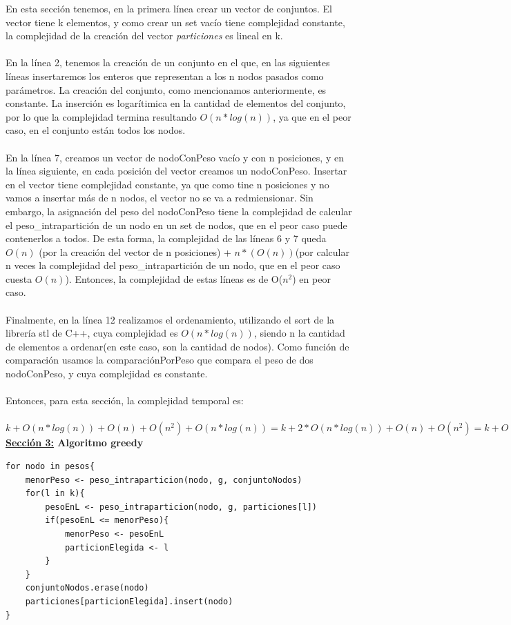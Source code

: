 En esta sección tenemos, en la primera línea crear un vector de conjuntos. El vector tiene k elementos, y como crear un set vacío tiene complejidad constante, la complejidad de la creación del vector \textit{particiones} es lineal en k.\\\\
En la línea 2, tenemos la creación de un conjunto en el que, en las siguientes líneas insertaremos los enteros que representan a los n nodos pasados como parámetros. La creación del conjunto, como mencionamos anteriormente, es constante. La inserción es logarítimica en la cantidad de elementos del conjunto, por lo que la complejidad termina resultando $O(n*log (n))$, ya que en el peor caso, en el conjunto están todos los nodos.\\\\
En la línea 7, creamos un vector de nodoConPeso vacío y con n posiciones, y en la línea siguiente, en cada posición del vector creamos un nodoConPeso. Insertar en el vector tiene complejidad constante, ya que como tine n posiciones y no vamos a insertar más de n nodos, el vector no se va a redmiensionar. Sin embargo, la asignación del peso del nodoConPeso tiene la complejidad de calcular el peso\_intrapartición de un nodo en un set de nodos, que en el peor caso puede contenerlos a todos. De esta forma, la complejidad de las líneas 6 y 7 queda $O(n)$ (por la creación del vector de n posiciones) + $n*(O(n))$(por calcular n veces la complejidad del peso\_intrapartición de un nodo, que en el peor caso cuesta $O(n)$). Entonces, la complejidad de estas líneas es de O($n^2$) en peor caso.\\\\
Finalmente, en la línea 12 realizamos el ordenamiento, utilizando el sort de la librería stl de C++, cuya complejidad es $O(n*log (n))$, siendo n la cantidad de elementos a ordenar(en este caso, son la cantidad de nodos). Como función de comparación usamos la comparaciónPorPeso que compara el peso de dos nodoConPeso, y cuya complejidad es constante.\\\\
Entonces, para esta sección, la complejidad temporal es:\\\\
$k + O(n*log(n))+O(n)+ O(n^2)+O(n*log(n)) = k + 2*O(n*log(n)) + O(n) + O(n^2) = k +  O(n^2)$\\

\textbf{\underline{Sección 3:} Algoritmo greedy}

\begin{lstlisting}[mathescape]
for nodo in pesos{
	menorPeso <- peso_intraparticion(nodo, g, conjuntoNodos)
	for(l in k){
		pesoEnL <- peso_intraparticion(nodo, g, particiones[l])
		if(pesoEnL <= menorPeso){
			menorPeso <- pesoEnL
			particionElegida <- l
		}
	}
	conjuntoNodos.erase(nodo)
	particiones[particionElegida].insert(nodo)
}
\end{lstlisting}

